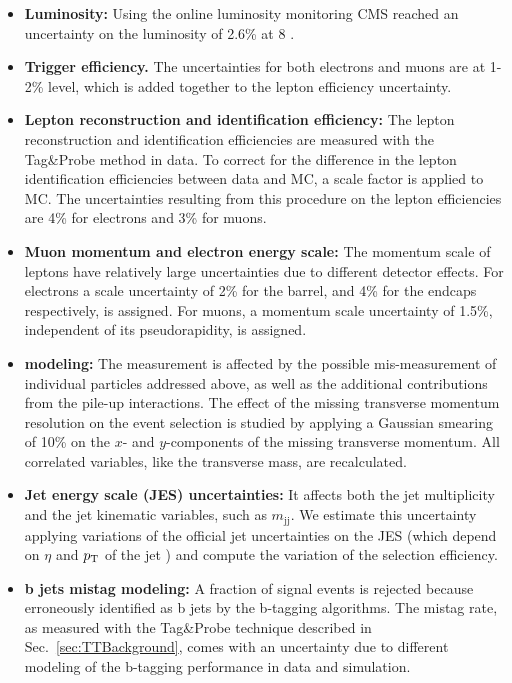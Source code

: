\begin{itemize}
\item {\bf Luminosity:} Using the online luminosity monitoring CMS
  reached an uncertainty on the luminosity of 2.6\% at 8 \TeV.

\item {\bf Trigger efficiency.} The uncertainties for both electrons and muons
  are at 1-2\% level, which is added together to the lepton efficiency uncertainty.

\item {\bf Lepton reconstruction and identification efficiency:} 
   The lepton reconstruction and identification efficiencies are measured with the Tag\&Probe
   method in data. To correct for the difference in the lepton identification
   efficiencies between data and MC, a scale factor is applied to MC.
   The uncertainties resulting from this procedure on the lepton efficiencies are 4\% for electrons and 3\% for muons.

\item {\bf Muon momentum and electron energy scale:} 
  The momentum scale of leptons have relatively large uncertainties due to different detector effects. 
  For electrons a scale  uncertainty of 2\% for the barrel, and 4\% for the endcaps respectively, 
  is assigned. 
  For muons, a momentum scale uncertainty of 1.5\%, independent of its pseudorapidity,  is assigned. 

\item {\bf {\boldmath \MET} modeling:} 
  The \MET measurement is affected by the possible mis-measurement of 
  individual particles addressed above, as well as the additional contributions 
  from the pile-up interactions. 
  The effect of the missing transverse momentum resolution on the event selection
  is studied by applying a Gaussian smearing of 10\% on the $x$- and
  $y$-components of the missing transverse momentum. All correlated variables,
  like the transverse mass, are recalculated. 

\item {\bf Jet energy scale (JES) uncertainties:} 
  It affects both the jet multiplicity and the 
  jet kinematic variables, such as $m_\mathrm{jj}$.
  We estimate this uncertainty applying variations of the official
  jet uncertainties on the JES (which depend on $\eta$ and $p_\mathrm{T}$ of the jet 
   \cite{JEC2012}) and
  compute the variation of the selection efficiency. %

\item {\bf b jets mistag modeling:}
     A fraction of signal events is rejected because erroneously identified as b jets by the b-tagging algorithms.
     The mistag rate, as measured with the Tag\&Probe technique described in Sec.~\ref{sec:TTBackground}, comes with an uncertainty due to different modeling of the b-tagging performance in data and simulation.
          

\end{itemize}
